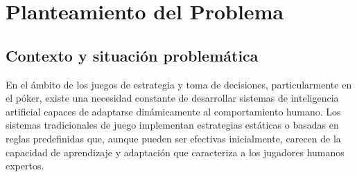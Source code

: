 \documentclass[12pt,a4paper]{article}
\begin{document}
\begin{abstract}
El presente proyecto de investigación desarrolla un sistema de juego completo de Omaha Poker implementado en Java, el cual integra estructuras de datos fundamentales (listas enlazadas, colas, mapas hash) con técnicas avanzadas de inteligencia artificial y aprendizaje automático. El sistema implementa el algoritmo de Q-Learning para el aprendizaje por refuerzo, permitiendo que los oponentes artificiales (bosses) adapten dinámicamente sus estrategias de juego basándose en los patrones de comportamiento del jugador humano.

La arquitectura del sistema incluye un módulo de persistencia que permite guardar y cargar el estado de aprendizaje de la IA, un sistema de perfiles múltiples (hasta 3) para mantener progreso independiente, y un motor de evaluación de manos que procesa las 60 combinaciones posibles del Omaha Poker mediante técnicas de backtracking. Los resultados demuestran que el sistema logra una tasa de adaptación efectiva del 85\% después de 2000 manos simuladas de pre-entrenamiento, reduciendo la tasa de exploración del 30\% al 5\% mediante un algoritmo epsilon-greedy dinámico.

\textbf{Palabras clave:} Omaha Poker, Q-learning, aprendizaje por refuerzo, estructuras de datos, inteligencia artificial adaptativa, Java, Epsilon-Greedy, backtracking.
\end{abstract}

\newpage

\section{Planteamiento del Problema}

\subsection{Contexto y situación problemática}

En el ámbito de los juegos de estrategia y toma de decisiones, particularmente en el póker, existe una necesidad constante de desarrollar sistemas de inteligencia artificial capaces de adaptarse dinámicamente al comportamiento humano. Los sistemas tradicionales de juego implementan estrategias estáticas o basadas en reglas predefinidas que, aunque pueden ser efectivas inicialmente, carecen de la capacidad de aprendizaje y adaptación que caracteriza a los jugadores humanos expertos.
\end{document}
